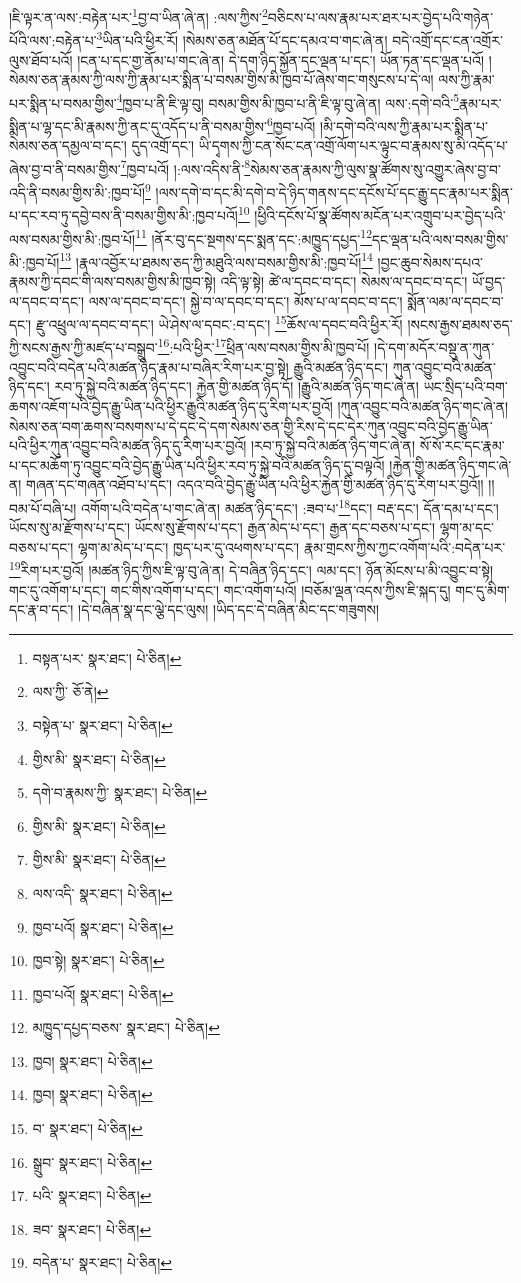 །ཇི་ལྟར་ན་ལས་:བརྟེན་པར་\footnote{བསྟན་པར་  སྣར་ཐང་།  པེ་ཅིན། }བྱ་བ་ཡིན་ཞེ་ན། :ལས་ཀྱིས་\footnote{ལས་ཀྱི་  ཅོ་ནེ། }བཅིངས་པ་ལས་རྣམ་པར་ཐར་པར་བྱེད་པའི་གཉེན་པོའི་ལས་:བརྟེན་པ་\footnote{བསྟེན་པ་  སྣར་ཐང་།  པེ་ཅིན། }ཡིན་པའི་ཕྱིར་རོ། །སེམས་ཅན་མཐོན་པོ་དང་དམའ་བ་གང་ཞེ་ན། བདེ་འགྲོ་དང་ངན་འགྲོར་ལུས་ཐོབ་པའོ། །ངན་པ་དང་གྱ་ནོམ་པ་གང་ཞེ་ན། དེ་དག་ཉིད་སྐྱོན་དང་ལྡན་པ་དང་། ཡོན་ཏན་དང་ལྡན་པའོ། །སེམས་ཅན་རྣམས་ཀྱི་ལས་ཀྱི་རྣམ་པར་སྨིན་པ་བསམ་གྱིས་མི་ཁྱབ་པོ་ཞེས་གང་གསུངས་པ་དེ་ལ། ལས་ཀྱི་རྣམ་པར་སྨིན་པ་བསམ་གྱིས་\footnote{གྱིས་མི་  སྣར་ཐང་།  པེ་ཅིན། }ཁྱབ་པ་ནི་ཇི་ལྟ་བུ། བསམ་གྱིས་མི་ཁྱབ་པ་ནི་ཇི་ལྟ་བུ་ཞེ་ན། ལས་:དགེ་བའི་\footnote{དགེ་བ་རྣམས་ཀྱི་  སྣར་ཐང་།  པེ་ཅིན། }རྣམ་པར་སྨིན་པ་ལྷ་དང་མི་རྣམས་ཀྱི་ནང་དུ་འདོད་པ་ནི་བསམ་གྱིས་\footnote{གྱིས་མི་  སྣར་ཐང་།  པེ་ཅིན། }ཁྱབ་པའོ། །མི་དགེ་བའི་ལས་ཀྱི་རྣམ་པར་སྨིན་པ་སེམས་ཅན་དམྱལ་བ་དང་། དུད་འགྲོ་དང་། ཡི་དྭགས་ཀྱི་ངན་སོང་ངན་འགྲོ་ལོག་པར་ལྟུང་བ་རྣམས་སུ་མི་འདོད་པ་ཞེས་བྱ་བ་ནི་བསམ་གྱིས་\footnote{གྱིས་མི་  སྣར་ཐང་།  པེ་ཅིན། }ཁྱབ་པའོ། །:ལས་འདིས་ནི་\footnote{ལས་འདི་  སྣར་ཐང་།  པེ་ཅིན། }སེམས་ཅན་རྣམས་ཀྱི་ལུས་སྣ་ཚོགས་སུ་འགྱུར་ཞེས་བྱ་བ་འདི་ནི་བསམ་གྱིས་མི་:ཁྱབ་པོ།\footnote{ཁྱབ་པའོ།  སྣར་ཐང་།  པེ་ཅིན། } །ལས་དགེ་བ་དང་མི་དགེ་བ་དེ་ཉིད་གནས་དང་དངོས་པོ་དང་རྒྱུ་དང་རྣམ་པར་སྨིན་པ་དང་རབ་ཏུ་དབྱེ་བས་ནི་བསམ་གྱིས་མི་:ཁྱབ་པའོ།\footnote{ཁྱབ་སྟེ།  སྣར་ཐང་།  པེ་ཅིན། } །ཕྱིའི་དངོས་པོ་སྣ་ཚོགས་མངོན་པར་འགྲུབ་པར་བྱེད་པའི་ལས་བསམ་གྱིས་མི་:ཁྱབ་པོ།\footnote{ཁྱབ་པའོ།  སྣར་ཐང་།  པེ་ཅིན། } །ནོར་བུ་དང་སྔགས་དང་སྨན་དང་:མཁྱུད་དཔྱད་\footnote{མཁྱུད་དཔྱད་བཅས་  སྣར་ཐང་།  པེ་ཅིན། }དང་ལྡན་པའི་ལས་བསམ་གྱིས་མི་:ཁྱབ་པོ།\footnote{ཁྱབ།  སྣར་ཐང་།  པེ་ཅིན། } །རྣལ་འབྱོར་པ་ཐམས་ཅད་ཀྱི་མཐུའི་ལས་བསམ་གྱིས་མི་:ཁྱབ་པོ།\footnote{ཁྱབ།  སྣར་ཐང་།  པེ་ཅིན། } །བྱང་ཆུབ་སེམས་དཔའ་རྣམས་ཀྱི་དབང་གི་ལས་བསམ་གྱིས་མི་ཁྱབ་སྟེ། འདི་ལྟ་སྟེ། ཚེ་ལ་དབང་བ་དང་། སེམས་ལ་དབང་བ་དང་། ཡོ་བྱད་ལ་དབང་བ་དང་། ལས་ལ་དབང་བ་དང་། སྐྱེ་བ་ལ་དབང་བ་དང་། མོས་པ་ལ་དབང་བ་དང་། སྨོན་ལམ་ལ་དབང་བ་དང་། རྫུ་འཕྲུལ་ལ་དབང་བ་དང་། ཡེ་ཤེས་ལ་དབང་:བ་དང་། \footnote{བ་  སྣར་ཐང་།  པེ་ཅིན། }ཆོས་ལ་དབང་བའི་ཕྱིར་རོ། །སངས་རྒྱས་ཐམས་ཅད་ཀྱི་སངས་རྒྱས་ཀྱི་མཛད་པ་བསྒྲུབ་\footnote{སྒྲུབ་  སྣར་ཐང་།  པེ་ཅིན། }:པའི་ཕྱིར་\footnote{པའི་  སྣར་ཐང་།  པེ་ཅིན། }ཕྲིན་ལས་བསམ་གྱིས་མི་ཁྱབ་པོ། །དེ་དག་མདོར་བསྡུ་ན་ཀུན་འབྱུང་བའི་བདེན་པའི་མཚན་ཉིད་རྣམ་པ་བཞིར་རིག་པར་བྱ་སྟེ། རྒྱུའི་མཚན་ཉིད་དང་། ཀུན་འབྱུང་བའི་མཚན་ཉིད་དང་། རབ་ཏུ་སྐྱེ་བའི་མཚན་ཉིད་དང་། རྐྱེན་གྱི་མཚན་ཉིད་དོ། །རྒྱུའི་མཚན་ཉིད་གང་ཞེ་ན། ཡང་སྲིད་པའི་བག་ཆགས་འཇོག་པའི་བྱེད་རྒྱུ་ཡིན་པའི་ཕྱིར་རྒྱུའི་མཚན་ཉིད་དུ་རིག་པར་བྱའོ། །ཀུན་འབྱུང་བའི་མཚན་ཉིད་གང་ཞེ་ན། སེམས་ཅན་བག་ཆགས་བསགས་པ་དེ་དང་དེ་དག་སེམས་ཅན་གྱི་རིས་དེ་དང་དེར་ཀུན་འབྱུང་བའི་བྱེད་རྒྱུ་ཡིན་པའི་ཕྱིར་ཀུན་འབྱུང་བའི་མཚན་ཉིད་དུ་རིག་པར་བྱའོ། །རབ་ཏུ་སྐྱེ་བའི་མཚན་ཉིད་གང་ཞེ་ན། སོ་སོ་རང་དང་རྣམ་པ་དང་མཆོག་ཏུ་འབྱུང་བའི་བྱེད་རྒྱུ་ཡིན་པའི་ཕྱིར་རབ་ཏུ་སྐྱེ་བའི་མཚན་ཉིད་དུ་བལྟའོ། །རྐྱེན་གྱི་མཚན་ཉིད་གང་ཞེ་ན། གཞན་དང་གཞན་འཐོབ་པ་དང་། འདའ་བའི་བྱེད་རྒྱུ་ཡིན་པའི་ཕྱིར་རྐྱེན་གྱི་མཚན་ཉིད་དུ་རིག་པར་བྱའོ།། །།བམ་པོ་བཞི་པ། འགོག་པའི་བདེན་པ་གང་ཞེ་ན། མཚན་ཉིད་དང་། :ཟབ་པ་\footnote{ཟབ་  སྣར་ཐང་།  པེ་ཅིན། }དང་། བརྡ་དང་། དོན་དམ་པ་དང་། ཡོངས་སུ་མ་རྫོགས་པ་དང་། ཡོངས་སུ་རྫོགས་པ་དང་། རྒྱན་མེད་པ་དང་། རྒྱན་དང་བཅས་པ་དང་། ལྷག་མ་དང་བཅས་པ་དང་། ལྷག་མ་མེད་པ་དང་། ཁྱད་པར་དུ་འཕགས་པ་དང་། རྣམ་གྲངས་ཀྱིས་ཀྱང་འགོག་པའི་:བདེན་པར་\footnote{བདེན་པ་  སྣར་ཐང་།  པེ་ཅིན། }རིག་པར་བྱའོ། །མཚན་ཉིད་ཀྱིས་ཇི་ལྟ་བུ་ཞེ་ན། དེ་བཞིན་ཉིད་དང་། ལམ་དང་། ཉོན་མོངས་པ་མི་འབྱུང་བ་སྟེ། གང་དུ་འགོག་པ་དང་། གང་གིས་འགོག་པ་དང་། གང་འགོག་པའོ། །བཅོམ་ལྡན་འདས་ཀྱིས་ཇི་སྐད་དུ། གང་དུ་མིག་དང་རྣ་བ་དང་། །དེ་བཞིན་སྣ་དང་ལྕེ་དང་ལུས། །ཡིད་དང་དེ་བཞིན་མིང་དང་གཟུགས། 